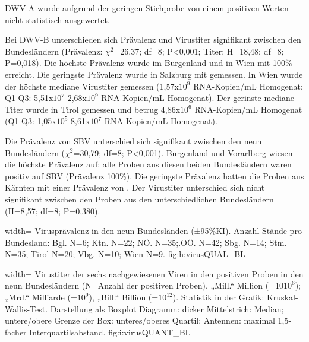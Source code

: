 DWV-A wurde aufgrund der geringen Stichprobe von einem positiven Werten nicht statistisch ausgewertet.

Bei DWV-B unterschieden sich Prävalenz und Virustiter signifikant zwischen den Bundesländern (Prävalenz: $\chi^2$=26,37; df=8; P<0,001; Titer: H=18,48; df=8; P=0,018). Die höchste Prävalenz wurde im Burgenland und in Wien mit 100\% erreicht. Die geringste Prävalenz wurde in Salzburg mit  gemessen. In Wien wurde der höchste mediane Virustiter gemessen (1,57x$10^9$ RNA-Kopien/\si{\milli\liter} Homogenat; Q1-Q3: 5,51x$10^7$-2,68x$10^9$ RNA-Kopien/\si{\milli\liter} Homogenat). Der gerinste mediane Titer wurde in Tirol gemessen und betrug 4,86x$10^6$ RNA-Kopien/\si{\milli\liter} Homogenat (Q1-Q3: 1,05x$10^5$-8,61x$10^7$ RNA-Kopien/\si{\milli\liter} Homogenat).


Die Prävalenz von SBV unterschied sich signifikant zwischen den neun Bundesländern ($\chi^2$=30,79; df=8; P<0,001). Burgenland und Vorarlberg wiesen die höchste Prävalenz auf; alle Proben aus diesen beiden Bundesländern waren positiv auf SBV (Prävalenz 100\%). Die geringste Prävalenz hatten die Proben aus Kärnten mit einer Prävalenz von . Der Virustiter unterschied sich nicht signifikant zwischen den Proben aus den unterschiedlichen Bundesländern (H=8,57; df=8; P=0,380).

  {width=\textwidth} %
  {Virusprävalenz in den neun Bundesländen (±95\%KI). Anzahl Stände pro Bundesland: Bgl. N=6; Ktn. N=22; NÖ. N=35;.OÖ. N=42; Sbg. N=14; Stm. N=35; Tirol N=20; Vbg. N=10; Wien N=9.} %
  {} %
  {fig:h:virusQUAL_BL} %
  
  
  {width=\textwidth} %
  {Virustiter der sechs nachgewiesenen Viren in den positiven Proben in den neun Bundesländern (N=Anzahl der positiven Proben). „Mill.“ Million (=10$10^6$); „Mrd.“ Milliarde (=$10^9$), „Bill.“ Billion (=$10^{12}$). Statistik in der Grafik: Kruskal-Wallis-Test. Darstellung als Boxplot Diagramm: dicker Mittelstrich: Median; untere/obere Grenze der Box: unteres/oberes Quartil; Antennen: maximal 1,5-facher Interquartilsabstand.} %
  {} %
  {fig:i:virusQUANT_BL} %






